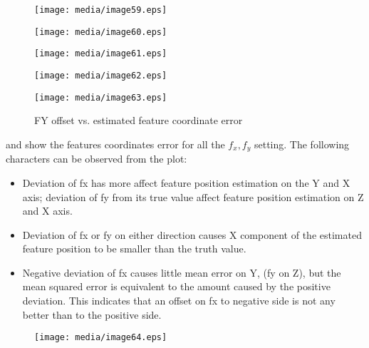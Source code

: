 



\begin{figure}[h]
\centering
\texttt{[image: media/image59.eps]}
\end{figure}


\begin{figure}[h]
\centering
\texttt{[image: media/image60.eps]}
\end{figure}


\begin{figure}[h]
\centering
\texttt{[image: media/image61.eps]}
\end{figure}





\begin{figure}[h]
\centering
\texttt{[image: media/image62.eps]}
\end{figure}


\begin{figure}[h]
\centering
\texttt{[image: media/image63.eps]}
\caption{\label{figure:_Ref349492417} FY offset vs. estimated feature 
coordinate error}
\end{figure}



 and show the features coordinates error for all the $ f_{x}, f_{y}$ 
setting. The following characters can be observed from the plot:

\begin{itemize}
\item Deviation of fx has more affect feature position estimation on the 
Y and X axis; deviation of fy from its true value affect feature 
position estimation on Z and X axis.
\item Deviation of fx or fy on either direction causes X component of 
the estimated feature position to be smaller than the truth value. 
\item Negative deviation of fx causes little mean error on Y, (fy on Z), 
but the mean squared error is equivalent to the amount caused by the 
positive deviation. This indicates that an offset on fx to negative side 
is not any better than to the positive side. 
\end{itemize}
\begin{figure}[h]
\centering
\texttt{[image: media/image64.eps]}
\end{figure}


